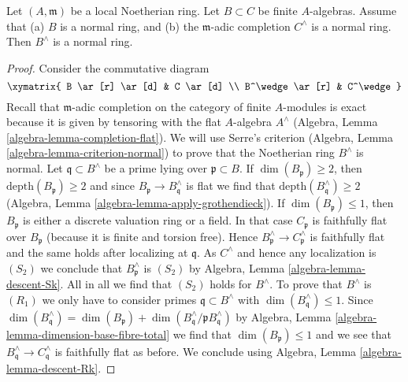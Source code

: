 \begin{lemma}
\label{lemma-algebra-helper}
Let $(A, \mathfrak m)$ be a local Noetherian ring. Let $B \subset C$
be finite $A$-algebras. Assume that (a) $B$ is a normal ring, and
(b) the $\mathfrak m$-adic completion $C^\wedge$ is a normal ring.
Then $B^\wedge$ is a normal ring.
\end{lemma}

\begin{proof}
Consider the commutative diagram
$$
\xymatrix{
B \ar[r] \ar[d] & C \ar[d] \\
B^\wedge \ar[r] & C^\wedge
}
$$
Recall that $\mathfrak m$-adic completion on the category of
finite $A$-modules is exact because it is given by tensoring with
the flat $A$-algebra $A^\wedge$
(Algebra, Lemma \ref{algebra-lemma-completion-flat}).
We will use Serre's criterion
(Algebra, Lemma \ref{algebra-lemma-criterion-normal})
to prove that the Noetherian ring $B^\wedge$ is normal.
Let $\mathfrak q \subset B^\wedge$ be a prime lying over
$\mathfrak p \subset B$. If $\dim(B_\mathfrak p) \geq 2$, then
$\text{depth}(B_\mathfrak p) \geq 2$ and since
$B_\mathfrak p \to B^\wedge_\mathfrak q$ is flat we find
that $\text{depth}(B^\wedge_\mathfrak q) \geq 2$
(Algebra, Lemma \ref{algebra-lemma-apply-grothendieck}).
If $\dim(B_\mathfrak p) \leq 1$, then $B_\mathfrak p$ is
either a discrete valuation ring or a field.
In that case $C_\mathfrak p$ is faithfully flat over $B_\mathfrak p$
(because it is finite and torsion free).
Hence $B^\wedge_\mathfrak p \to C^\wedge_\mathfrak p$ is
faithfully flat and the same holds after localizing at $\mathfrak q$.
As $C^\wedge$ and hence any localization is $(S_2)$ we conclude that
$B^\wedge_\mathfrak p$ is $(S_2)$ by
Algebra, Lemma \ref{algebra-lemma-descent-Sk}.
All in all we find that
$(S_2)$ holds for $B^\wedge$. To prove that $B^\wedge$ is
$(R_1)$ we only have to consider primes $\mathfrak q \subset B^\wedge$
with $\dim(B^\wedge_\mathfrak q) \leq 1$. Since
$\dim(B^\wedge_\mathfrak q) = \dim(B_\mathfrak p) +
\dim(B^\wedge_\mathfrak q/\mathfrak p B^\wedge_\mathfrak q)$ by
Algebra, Lemma \ref{algebra-lemma-dimension-base-fibre-total}
we find that $\dim(B_\mathfrak p) \leq 1$ and
we see that $B^\wedge_\mathfrak q \to C^\wedge_\mathfrak q$
is faithfully flat as before. We conclude using
Algebra, Lemma \ref{algebra-lemma-descent-Rk}.
\end{proof}

